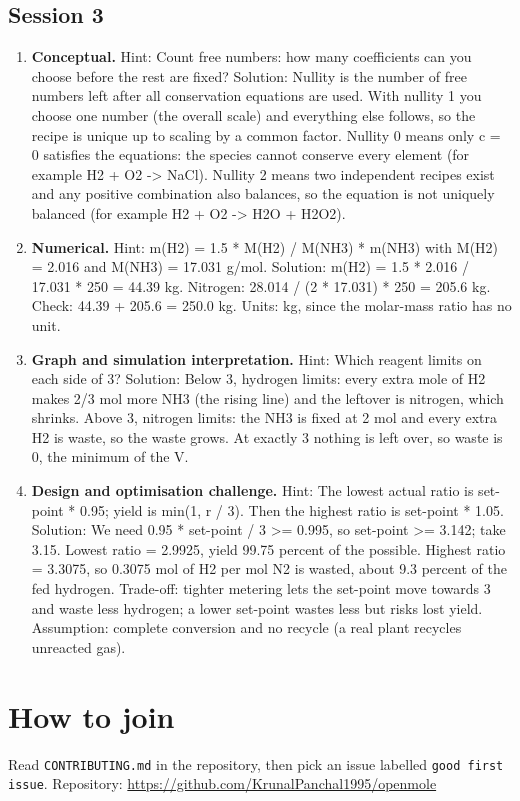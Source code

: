 \documentclass[11pt,a4paper]{article}
\begin{document}
\subsection*{Session 3}
\begin{enumerate}[nosep]
\item \textbf{Conceptual.} Hint: Count free numbers: how many coefficients can you choose before the rest are fixed? Solution: Nullity is the number of free numbers left after all conservation equations are used. With nullity 1 you choose one number (the overall scale) and everything else follows, so the recipe is unique up to scaling by a common factor. Nullity 0 means only c = 0 satisfies the equations: the species cannot conserve every element (for example H2 + O2 -\textgreater{} NaCl). Nullity 2 means two independent recipes exist and any positive combination also balances, so the equation is not uniquely balanced (for example H2 + O2 -\textgreater{} H2O + H2O2).
\item \textbf{Numerical.} Hint: m(H2) = 1.5 * M(H2) / M(NH3) * m(NH3) with M(H2) = 2.016 and M(NH3) = 17.031 g/mol. Solution: m(H2) = 1.5 * 2.016 / 17.031 * 250 = 44.39 kg. Nitrogen: 28.014 / (2 * 17.031) * 250 = 205.6 kg. Check: 44.39 + 205.6 = 250.0 kg. Units: kg, since the molar-mass ratio has no unit.
\item \textbf{Graph and simulation interpretation.} Hint: Which reagent limits on each side of 3? Solution: Below 3, hydrogen limits: every extra mole of H2 makes 2/3 mol more NH3 (the rising line) and the leftover is nitrogen, which shrinks. Above 3, nitrogen limits: the NH3 is fixed at 2 mol and every extra H2 is waste, so the waste grows. At exactly 3 nothing is left over, so waste is 0, the minimum of the V.
\item \textbf{Design and optimisation challenge.} Hint: The lowest actual ratio is set-point * 0.95; yield is min(1, r / 3). Then the highest ratio is set-point * 1.05. Solution: We need 0.95 * set-point / 3 \textgreater{}= 0.995, so set-point \textgreater{}= 3.142; take 3.15. Lowest ratio = 2.9925, yield 99.75 percent of the possible. Highest ratio = 3.3075, so 0.3075 mol of H2 per mol N2 is wasted, about 9.3 percent of the fed hydrogen. Trade-off: tighter metering lets the set-point move towards 3 and waste less hydrogen; a lower set-point wastes less but risks lost yield. Assumption: complete conversion and no recycle (a real plant recycles unreacted gas).
\end{enumerate}

\section{How to join}
Read \texttt{CONTRIBUTING.md} in the repository, then pick an issue labelled \texttt{good first issue}. Repository: \url{https://github.com/KrunalPanchal1995/openmole}
\end{document}
